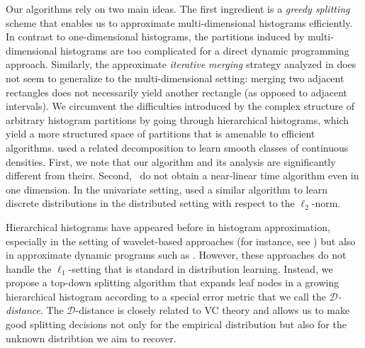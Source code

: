\documentclass[final,12pt]{colt2018} %
\newcommand{\hier}{\mathcal{D}}
\newcommand{\new}[1]{{\color{red} #1}}
\newcommand{\new}[1]{{#1}}
\begin{document}
Our algorithms rely on two main ideas.
The first ingredient is a \emph{greedy splitting} scheme that 
enables us to approximate multi-dimensional histograms efficiently.
In contrast to one-dimensional histograms, the partitions induced by multi-dimensional histograms 
are too complicated for a direct dynamic programming approach.
Similarly, the approximate {\em iterative merging} strategy analyzed in \cite{ADLS17} 
does not seem to generalize to the multi-dimensional setting: merging 
two adjacent rectangles does not necessarily yield another rectangle (as opposed to adjacent intervals).
We circumvent the difficulties introduced by the complex structure 
of arbitrary histogram partitions by going through hierarchical histograms, 
which yield a more structured space of partitions that is amenable to efficient algorithms.
\new{\cite{WillettN07} used a related decomposition to learn smooth classes of continuous 
densities. First, we note that our algorithm and its analysis are significantly different from theirs. 
Second,~\cite{WillettN07} do not obtain a near-linear time algorithm 
even in one dimension. In the univariate setting, \cite{DiakonikolasG0N17} used a similar algorithm 
to learn discrete distributions in the distributed setting with respect to the $\ell_2$-norm.}

Hierarchical histograms have appeared before in histogram approximation, 
especially in the setting of wavelet-based approaches (for instance, see \cite{GKMS01,GGI+02}) 
but also in approximate dynamic programs such as \cite{MPS99}. However, these approaches do not handle 
the $\ell_1$-setting that is standard in distribution learning.
Instead, we propose a top-down splitting algorithm that expands leaf nodes in a growing hierarchical histogram according to a special error metric that we call the \emph{$\hier$-distance}.
The $\hier$-distance is closely related to VC theory and allows us to make good splitting decisions not only for the empirical distribution but also for the unknown distribtion we aim to recover.
\end{document}

